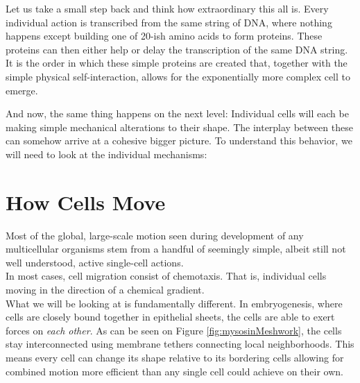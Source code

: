 Let us take a small step back and think how extraordinary this all is. Every individual action is transcribed from the same string of DNA, where nothing happens except building one of 20-ish amino acids to form proteins. These proteins can then either help or delay the transcription of the same DNA string. It is the order in which these simple proteins are created that, together with the simple physical self-interaction, allows for the exponentially more complex cell to emerge.


And now, the same thing happens on the next level: Individual cells will each be making simple mechanical alterations to their shape. The interplay between these can somehow arrive at a cohesive bigger picture. To understand this behavior, we will need to look at the individual mechanisms:

\section{How Cells Move}
\label{sec:howmove}
Most of the global, large-scale motion seen during development of any multicellular organisms stem from a handful of seemingly simple, albeit still not well understood, active single-cell actions.\cite{walck2014cell}\\

In most cases, cell migration consist of chemotaxis. That is, individual cells moving in the direction of a chemical gradient.\\
What we will be looking at is fundamentally different. In embryogenesis, where cells are closely bound together in epithelial sheets, the cells are able to exert forces on \textit{each other}. As can be seen on Figure \ref{fig:mysosinMeshwork}, the cells stay interconnected using membrane tethers connecting local neighborhoods. This means every cell can change its shape relative to its bordering cells allowing for combined motion more efficient than any single cell could achieve on their own.\cite{pare2020cellular}


